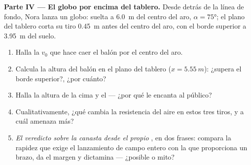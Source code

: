 \begin{problem}
\medskip\noindent\textbf{Parte IV --- El globo por encima del tablero.} Desde detrás
de la línea de fondo, Nora lanza un globo: suelta a \qty{6.0}{m} del centro del aro,
$\alpha = \ang{75}$; el plano del tablero corta su tiro \qty{0.45}{m} antes del centro
del aro, con el borde superior a \qty{3.95}{m} del suelo.
\begin{enumerate}[resume]
  \item Halla la $v_0$ que hace caer el balón por el centro del aro.
  \item Calcula la altura del balón en el plano del tablero ($x = \qty{5.55}{m}$):
        ¿supera el borde superior?, ¿por cuánto?
  \item Halla la altura de la cima y el  --- ¿por qué le encanta al
        público?
  \item Cualitativamente, ¿qué cambia la resistencia del aire en estos tres tiros, y a
        cuál amenaza más?
  \item \emph{El veredicto sobre la canasta desde el propio }, en dos frases:
        compara la rapidez que exige el lanzamiento de campo entero con la que
        proporciona un brazo, da el margen y dictamina --- ¿posible o mito?
\end{enumerate}
\end{problem}

